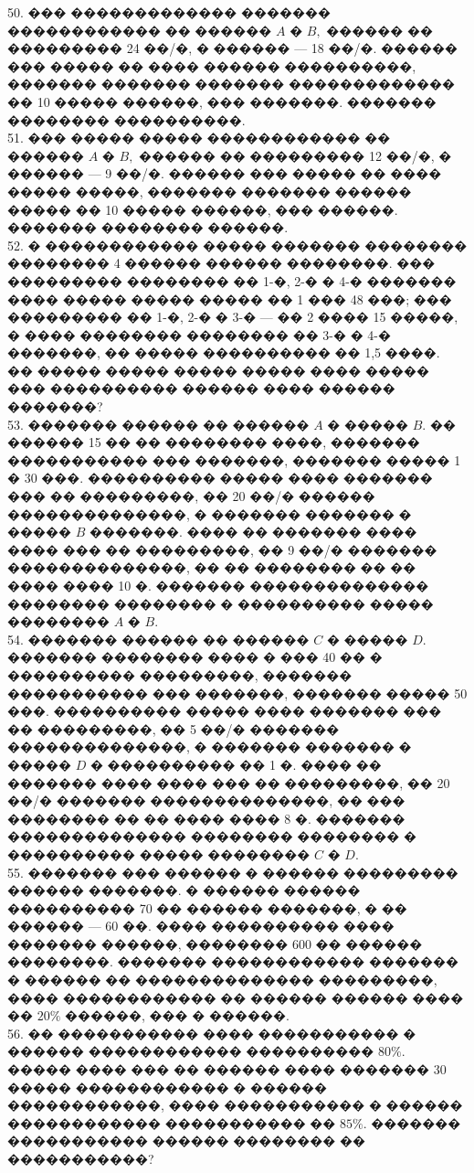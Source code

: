 \documentclass[12pt]{article}
\begin{document}
50. ��� ������������� ������� ������������ �� ������ $A$ � $B,$ ������ �� ��������� 24 ��/�, � ������ --- 18 ��/�. ������ ��� ����� �� ���� ������ ����������, ������� ������� ������� ������������� �� 10 ����� ������, ��� �������. ������� �������� ����������.\\
51. ��� ����� ����� ������������ �� ������ $A$ � $B,$ ������ �� ��������� 12 ��/�, � ������ --- 9 ��/�. ������ ��� ����� �� ���� ����� �����, ������� ������� ������ ����� �� 10 ����� ������, ��� ������. ������� �������� ������.\\
52. � ������������ ����� ������� �������� �������� 4 ������ ������ ��������. ��� ��������� �������� �� 1-�, 2-� � 4-� ������� ���� ����� ����� ����� �� 1 ��� 48 ���; ��� ��������� �� 1-�, 2-� � 3-� --- �� 2 ���� 15 �����, � ���� �������� �������� �� 3-� � 4-� �������, �� ����� ���������� �� 1,5 ����. �� ����� ����� ����� ����� ���� ����� ��� ���������� ������ ���� ������ �������?\\
53. ������� ������ �� ������ $A$ � ����� $B.$ �� ������ 15 �� �� �������� ����, ������� ����������� ��� �������, ������� ����� 1 � 30 ���. ���������� ����� ���� ������� ��� �� ���������, �� 20 ��/� ������ ��������������, � ������� ������� � ����� $B$ �������. ���� �� ������� ���� ���� ��� �� ���������, �� 9 ��/� ������� ��������������, �� �� �������� �� �� ���� ���� 10 �. ������� �������������� �������� �������� � ���������� ����� �������� $A$ � $B.$\\
54. ������� ������ �� ������ $C$ � ����� $D.$ ������� �������� ���� � ��� 40 �� � ���������� ���������, ������� ����������� ��� �������, ������� ����� 50 ���.  ���������� ����� ���� ������� ��� �� ���������, �� 5 ��/� ������� ��������������, � ������� ������� � ����� $D$ � ���������� �� 1 �. ���� �� ������� ���� ���� ��� �� ���������, �� 20 ��/� ������� ��������������, �� ��� �������� �� �� ���� ���� 8 �. ������� �������������� �������� �������� � ���������� ����� �������� $C$ � $D.$\\
55. ������� ��� ������ � ������ ��������� ������ �������. � ������ ������ ���������� 70 �� ������ �������, � �� ������ --- 60 ��. ���� ���������� ���� ������� ������, �������� 600 �� ������ ��������. ������� ������������ ������� � ������ �� �������������� ���������, ���� ������������ �� ������ ������ ���� �� $20\%$ ������, ��� � ������.\\
56. �� ����������� ���� ����������� � ������ ������������ ���������� $80\%.$ ����� ���� ��� �� ������ ���� ������� 30 ����� ������������ � ������ ������������, ���� ����������� � ������ ������������ ����������� �� $85\%.$ ������� ����������� ������ �������� �� �����������?\\
\end{document}
